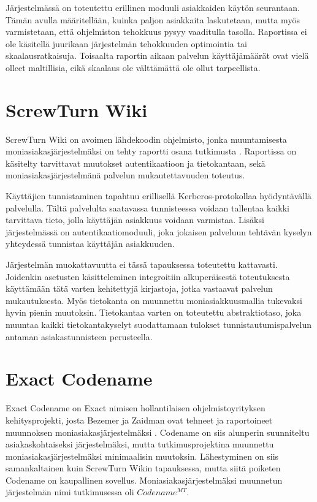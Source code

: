 Järjestelmässä on toteutettu erillinen moduuli asiakkaiden käytön seurantaan. Tämän avulla määritellään, kuinka paljon asiakkaita laskutetaan, mutta myös varmistetaan, että ohjelmiston tehokkuus pysyy vaaditulla tasolla. Raportissa ei ole käsitellä juurikaan järjestelmän tehokkuuden optimointia tai skaalausratkaisuja. Toisaalta raportin aikaan palvelun käyttäjämäärät ovat vielä olleet maltillisia, eikä skaalaus ole välttämättä ole ollut tarpeellista.

\section{ScrewTurn Wiki}
ScrewTurn Wiki on avoimen lähdekoodin ohjelmisto, jonka muuntamisesta moniasiakasjärjestelmäksi on tehty raportti osana tutkimusta \cite{bezemer2010challenges}. Raportissa on käsitelty tarvittavat muutokset autentikaatioon ja tietokantaan, sekä moniasiakasjärjestelmänä palvelun mukautettavuuden toteutus.

Käyttäjien tunnistaminen tapahtuu erillisellä Kerberos-protokollaa hyödyntävällä palvelulla. Tältä palvelulta saatavassa tunnisteessa voidaan tallentaa kaikki tarvittava tieto, jolla käyttäjän asiakkuus voidaan varmistaa. Lisäksi järjestelmässä on autentikaatiomoduuli, joka jokaisen palveluun tehtävän kyselyn yhteydessä tunnistaa käyttäjän asiakkuuden.

Järjestelmän muokattavuutta ei tässä tapauksessa toteutettu kattavasti. Joidenkin asetusten käsitteleminen integroitiin alkuperäisestä toteutuksesta käyttämään tätä varten kehitettyjä kirjastoja, jotka vastaavat palvelun mukautuksesta. Myös tietokanta on muunnettu moniasiakkuusmallia tukevaksi hyvin pienin muutoksin. Tietokantaa varten on toteutettu abstraktiotaso, joka muuntaa kaikki tietokantakyselyt suodattamaan tulokset tunnistautumispalvelun antaman asiakastunnisteen perusteella.

\section{Exact Codename}
Exact Codename on Exact nimisen hollantilaisen ohjelmistoyrityksen kehitysprojekti, josta Bezemer ja Zaidman ovat tehneet ja raportoineet muunnoksen moniasiakasjärjestelmäksi \cite{bezemer2010enabling}. Codename on siis alunperin suunniteltu asiakaskohtaiseksi järjestelmäksi, mutta tutkimusprojektina muunnettu moniasiakasjärjestelmäksi minimaalisin muutoksin. Lähestyminen on siis samankaltainen kuin ScrewTurn Wikin tapauksessa, mutta siitä poiketen Codename on kaupallinen sovellus. Moniasiakasjärjestelmäksi muunnetun järjestelmän nimi tutkimusessa oli $Codename^{MT}$.

